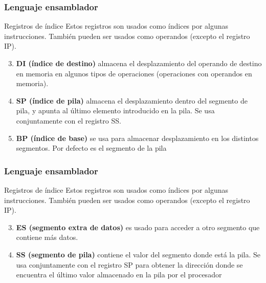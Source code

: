\documentclass{beamer}
\begin{document}
\begin{frame}
		\frametitle{Lenguaje ensamblador}
		\begin{block}{Registros de índice} \justify
Estos registros son usados como índices por algunas instrucciones. También pueden ser usados como operandos (excepto el registro IP).
			\begin{enumerate}\setcounter{enumi}{2}
				\item \textbf{DI (índice de destino)} almacena el desplazamiento del operando de destino en memoria en algunos tipos de operaciones (operaciones con operandos en memoria).
				\item \textbf{SP (índice de pila)} almacena el desplazamiento dentro del segmento de pila, y apunta al último elemento introducido en la pila. Se usa conjuntamente con el registro SS.
				\item \textbf{BP (índice de base)} se usa para almacenar desplazamiento en los distintos segmentos. Por defecto es el segmento de la pila 
		\end{enumerate}
	\end{block}		 		
\end{frame}


\begin{frame}
		\frametitle{Lenguaje ensamblador}
		\begin{block}{Registros de índice} \justify
Estos registros son usados como índices por algunas instrucciones. También pueden ser usados
como operandos (excepto el registro IP).
			\begin{enumerate}\setcounter{enumi}{2}
				\item \textbf{ES (segmento extra de datos)} es usado para acceder a otro segmento que contiene más datos. 
				\item \textbf{SS (segmento de pila)} contiene el valor del segmento donde está la pila. Se usa conjuntamente
con el registro SP para obtener la dirección donde se encuentra el último valor almacenado en la
pila por el procesador
			\end{enumerate}
	\end{block}		 		
\end{frame}
\end{document}
